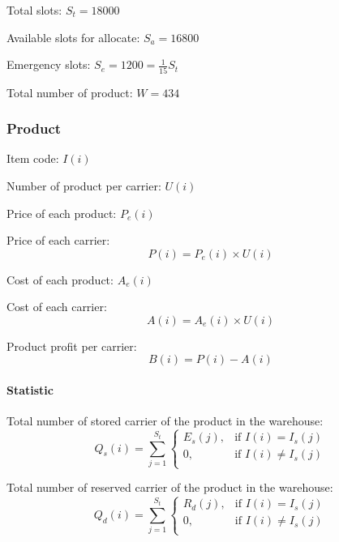     Total slots: \quad
    ${ S_{t} = 18000 }$

    Available slots for allocate: \quad
    ${S_{a} = 16800}$

    Emergency slots: \quad
    ${ S_{e} = 1200 = \frac{1}{15} S_{t} }$

    Total number of product: \quad
    ${ W = 434 }$

\subsubsection{Product}

    Item code: \quad
    ${ I(i) }$
    
    Number of product per carrier: \quad
    ${ U(i) }$
    
    Price of each product: \quad
    ${ P_e(i) }$

    Price of each carrier:
    \begin{equation}\label{eq:price}
        P(i) = P_e(i) \times U(i)
    \end{equation}
    
    Cost of each product: \quad
    ${ A_e(i) }$
    
    Cost of each carrier:
    \begin{equation}\label{eq:cost}
        A(i) = A_e(i) \times U(i)
    \end{equation}
    
    Product profit per carrier:
    \begin{equation}\label{eq:profit}
        B(i) = P(i) - A(i)
    \end{equation}

\paragraph{Statistic}\mbox{}

    Total number of stored carrier of the product in the warehouse: 
    \begin{equation}\label{eq:Qs}
        Q_s(i) = \sum_{j=1}^{S_t}
        \begin{cases}
            E_s(j), & \text{if  } I(i) = I_s(j) \\
            0, & \text{if  } I(i) \neq I_s(j) \\
        \end{cases}
    \end{equation}

    Total number of reserved carrier of the product in the warehouse:
    \begin{equation}\label{eq:Qd}
        Q_d(i) = \sum_{j=1}^{S_t}
        \begin{cases}
            R_d(j), & \text{if  } I(i) = I_s(j) \\
            0, & \text{if  } I(i) \neq I_s(j) \\
        \end{cases}
    \end{equation}
    
